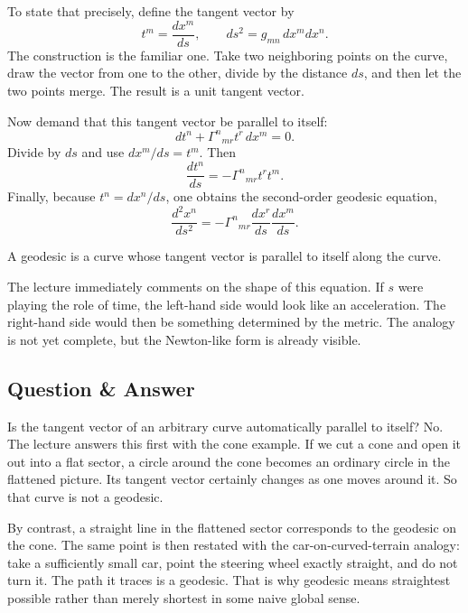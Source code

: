 To state that precisely, define the tangent vector by
\begin{equation}
t^m=\frac{dx^m}{ds},
\qquad
ds^2=g_{mn}\,dx^m dx^n.
\end{equation}
The construction is the familiar one. Take two neighboring points on the curve, draw the vector from one to the other, divide by the distance \(ds\), and then let the two points merge. The result is a unit tangent vector.

Now demand that this tangent vector be parallel to itself:
\begin{equation}
dt^n+\Gamma^{n}{}_{mr}t^r\,dx^m=0.
\end{equation}
Divide by \(ds\) and use \(dx^m/ds=t^m\). Then
\begin{equation}
\frac{dt^n}{ds}
=
-\Gamma^{n}{}_{mr}t^r t^m.
\end{equation}
Finally, because \(t^n=dx^n/ds\), one obtains the second-order geodesic equation,
\begin{equation}
\frac{d^2x^n}{ds^2}
=
-\Gamma^{n}{}_{mr}
\frac{dx^r}{ds}
\frac{dx^m}{ds}.
\end{equation}

\begin{definition}
A geodesic is a curve whose tangent vector is parallel to itself along the curve.
\end{definition}

The lecture immediately comments on the shape of this equation. If \(s\) were playing the role of time, the left-hand side would look like an acceleration. The right-hand side would then be something determined by the metric. The analogy is not yet complete, but the Newton-like form is already visible.

\subsection{Question \& Answer}

Is the tangent vector of an arbitrary curve automatically parallel to itself? No. The lecture answers this first with the cone example. If we cut a cone and open it out into a flat sector, a circle around the cone becomes an ordinary circle in the flattened picture. Its tangent vector certainly changes as one moves around it. So that curve is not a geodesic.

By contrast, a straight line in the flattened sector corresponds to the geodesic on the cone. The same point is then restated with the car-on-curved-terrain analogy: take a sufficiently small car, point the steering wheel exactly straight, and do not turn it. The path it traces is a geodesic. That is why geodesic means straightest possible rather than merely shortest in some naive global sense.

